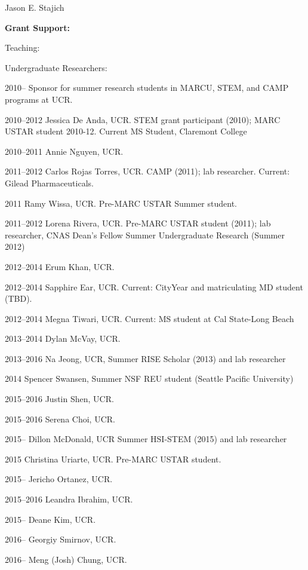 \documentclass[10pt]{article}
\begin{document}
\begin{cv}{\centerline{Jason E. Stajich}}
\begin{cvlistcompact}{\bf Grant Support:}
\begin{cvlistcompact}{Teaching:}
\end{cvlistcompact}

\begin{cvlistcompact}{Undergraduate Researchers:}
\item[2010--] Sponsor for summer research students in MARCU, STEM, and CAMP
  programs at UCR.
\item [2010--2012] Jessica De Anda, UCR. STEM grant participant
  (2010); MARC USTAR student 2010-12. Current MS Student, Claremont College
\item [2010--2011] Annie Nguyen, UCR.
\item [2011--2012] Carlos Rojas Torres, UCR. CAMP (2011); lab
  researcher. Current: Gilead Pharmaceuticals.
\item [2011] Ramy Wissa, UCR. Pre-MARC USTAR Summer student.
\item [2011--2012] Lorena Rivera, UCR. Pre-MARC USTAR student (2011); lab
  researcher, CNAS Dean's Fellow Summer Undergraduate Research (Summer 2012)
\item [2012--2014] Erum Khan, UCR.
\item [2012--2014] Sapphire Ear, UCR. Current: CityYear and
  matriculating MD student (TBD).
\item [2012--2014] Megna Tiwari, UCR. Current: MS student at Cal
  State-Long Beach
\item [2013--2014] Dylan McVay, UCR.
\item [2013--2016] Na Jeong, UCR, Summer RISE Scholar (2013) and lab researcher
\item [2014] Spencer Swansen, Summer NSF REU student (Seattle Pacific University)
\item [2015--2016] Justin Shen, UCR.
\item [2015--2016] Serena Choi, UCR.
\item [2015--] Dillon McDonald, UCR Summer HSI-STEM (2015) and lab researcher
\item [2015] Christina Uriarte, UCR. Pre-MARC USTAR student.
\item [2015--] Jericho Ortanez, UCR.
\item [2015--2016] Leandra Ibrahim, UCR.
\item [2015--] Deane Kim, UCR.
\item [2016--] Georgiy Smirnov, UCR.
\item [2016--] Meng (Josh) Chung, UCR.
\end{cvlistcompact}


\end{cvlistcompact}
\end{cv}
\end{document}
